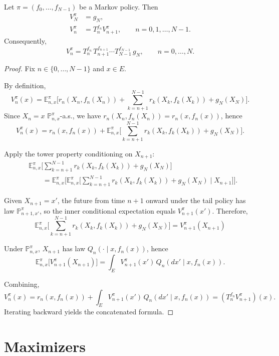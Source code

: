 \begin{theorem}
Let $\pi=(f_0,\dots,f_{N-1})$ be a Markov policy. Then
\begin{align*}
V_N^{\pi} &= g_N,\\
V_n^{\pi} &= T_n^{f_n} V_{n+1}^{\pi},\qquad n=0,1,\dots,N-1.
\end{align*}
Consequently,
\[
V_n^{\pi} = T_n^{f_n}\,T_{n+1}^{f_{n+1}}\cdots T_{N-1}^{f_{N-1}}\, g_N,
\qquad n=0,\dots,N.
\]
\end{theorem}

\begin{proof}
Fix $n\in\{0,\dots,N-1\}$ and $x\in E$.

By definition,
\[
V_n^{\pi}(x)=\mathbb{E}_{n,x}^{\pi}\Big[r_n(X_n,f_n(X_n)) + \sum_{k=n+1}^{N-1} r_k(X_k,f_k(X_k)) + g_N(X_N)\Big].
\]
Since $X_n=x$ $\mathbb{P}_{n,x}^\pi$-a.s., we have $r_n(X_n,f_n(X_n))=r_n(x,f_n(x))$, hence
\[
V_n^{\pi}(x)= r_n(x,f_n(x)) + \mathbb{E}_{n,x}^{\pi}\Big[\sum_{k=n+1}^{N-1} r_k(X_k,f_k(X_k)) + g_N(X_N)\Big].
\]

Apply the tower property conditioning on $X_{n+1}$:
\begin{align*}
&\mathbb{E}_{n,x}^{\pi}\Big[\sum_{k=n+1}^{N-1} r_k(X_k,f_k(X_k)) + g_N(X_N)\Big]\\
&\qquad=\mathbb{E}_{n,x}^{\pi}\Big[\mathbb{E}_{n,x}^{\pi}\big[\sum_{k=n+1}^{N-1} r_k(X_k,f_k(X_k)) + g_N(X_N)\mid X_{n+1}\big]\Big].
\end{align*}

Given $X_{n+1}=x'$, the future from time $n+1$ onward under the tail policy has law $\mathbb{P}_{n+1,x'}^{\pi}$, so the inner conditional expectation equals $V_{n+1}^{\pi}(x')$.
Therefore,
\[
\mathbb{E}_{n,x}^{\pi}\Big[\sum_{k=n+1}^{N-1} r_k(X_k,f_k(X_k)) + g_N(X_N)\Big]
=V_{n+1}^{\pi}(X_{n+1})
\]

Under $\mathbb{P}_{n,x}^{\pi}$, $X_{n+1}$ has law $Q_n(\cdot\mid x,f_n(x))$, hence
\[
\mathbb{E}_{n,x}^{\pi}\big[V_{n+1}^{\pi}(X_{n+1})\big]=\int_E V_{n+1}^{\pi}(x')\,Q_n(dx'\mid x,f_n(x)).
\]

Combining,
\[
V_n^{\pi}(x)=r_n(x,f_n(x))+\int_E V_{n+1}^{\pi}(x')\,Q_n(dx'\mid x,f_n(x))=(T_n^{f_n}V_{n+1}^{\pi})(x).
\]
Iterating backward yields the concatenated formula.
\end{proof}

\section{Maximizers}

